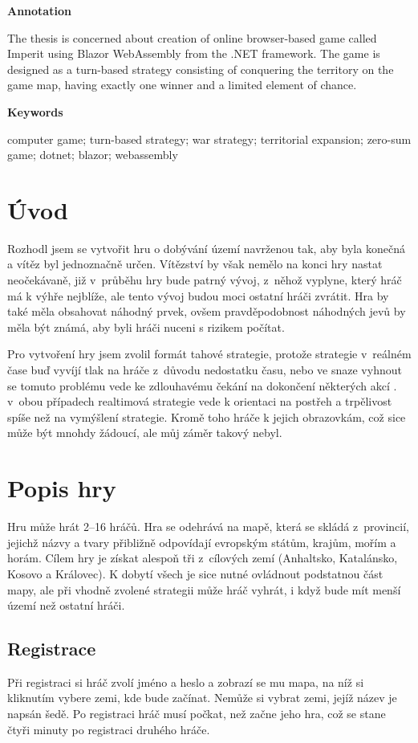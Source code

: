 \documentclass[a4paper,12pt]{article}
\begin{document}
\Large\textbf{Annotation}\normalsize

The thesis is concerned about creation of online browser-based game called Imperit using Blazor WebAssembly from the .NET framework. The game is designed as a turn-based strategy consisting of conquering the territory on the game map, having exactly one winner and a limited element of chance.

\Large\textbf{Keywords}\normalsize

computer game; turn-based strategy; war strategy; territorial expansion; zero-sum game;\- dotnet; blazor; webassembly
\newpage
\thispagestyle{empty}
\tableofcontents
\newpage
\section{Úvod}
Rozhodl jsem se vytvořit hru o dobývání území navrženou tak, aby byla konečná a vítěz byl jednoznačně určen. Vítězství by však nemělo na konci hry nastat neočekávaně, již v~průběhu hry bude patrný vývoj, z~něhož vyplyne, který hráč má k výhře nejblíže, ale tento vývoj budou moci ostatní hráči zvrátit. Hra by také měla obsahovat náhodný prvek, ovšem pravděpodobnost náhodných jevů by měla být známá, aby byli hráči nuceni s rizikem počítat.

Pro vytvoření hry jsem zvolil formát tahové strategie, protože strategie v~reálném čase buď vyvíjí tlak na hráče z~důvodu nedostatku času, nebo ve snaze vyhnout se tomuto problému vede ke zdlouhavému čekání na dokončení některých akcí \cite{turnreal1}. v~obou případech realtimová strategie vede k orientaci na postřeh a trpělivost spíše než na vymýšlení strategie\cite{turnreal2}. Kromě toho  hráče k jejich obrazovkám, což sice může být mnohdy žádoucí, ale můj záměr takový nebyl.

\section{Popis hry}
Hru může hrát 2--16 hráčů. Hra se odehrává na mapě, která se skládá z~provincií, jejichž názvy a tvary přibližně odpovídají evropským státům, krajům, mořím a horám. Cílem hry je získat alespoň tři z~cílových zemí (Anhaltsko, Katalánsko, Kosovo a Královec). K dobytí všech je sice nutné ovládnout podstatnou část mapy, ale při vhodně zvolené strategii může hráč vyhrát, i když bude mít menší území než ostatní hráči.
\subsection{Registrace}
Při registraci si hráč zvolí jméno a heslo a zobrazí se mu mapa, na níž si kliknutím vybere zemi, kde bude začínat. Nemůže si vybrat zemi, jejíž název je napsán šedě. Po registraci hráč musí počkat, než začne jeho hra, což se stane čtyři minuty po registraci druhého hráče.
\end{document}
